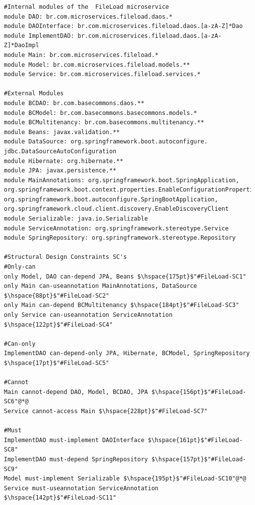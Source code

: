 \documentclass[12pt]{article}
\begin{document}
\begin{lstlisting}[style=colorido, caption={\textcolor{blue}{FileLoad microservice's architectural design specification.}},label={list:especArquiteturalFileLoad}
]
#Internal modules of the  FileLoad microservice
module DAO: br.com.microservices.fileload.daos.*
module DAOInterface: br.com.microservices.fileload.daos.[a-zA-Z]*Dao
module ImplementDAO: br.com.microservices.fileload.daos.[a-zA-Z]*DaoImpl
module Main: br.com.microservices.fileload.*
module Model: br.com.microservices.fileload.models.**
module Service: br.com.microservices.fileload.services.*

#External Modules
module BCDAO: br.com.basecommons.daos.**
module BCModel: br.com.basecommons.basecommons.models.*
module BCMultitenancy: br.com.basecommons.multitenancy.**
module Beans: javax.validation.**
module DataSource: org.springframework.boot.autoconfigure.
jdbc.DataSourceAutoConfiguration
module Hibernate: org.hibernate.**
module JPA: javax.persistence.**
module MainAnnotations: org.springframework.boot.SpringApplication, 
org.springframework.boot.context.properties.EnableConfigurationProperties, org.springframework.boot.autoconfigure.SpringBootApplication, org.springframework.cloud.client.discovery.EnableDiscoveryClient
module Serializable: java.io.Serializable
module ServiceAnnotation: org.springframework.stereotype.Service
module SpringRepository: org.springframework.stereotype.Repository

#Structural Design Constraints SC's
#Only-can 
only Model, DAO can-depend JPA, Beans $\hspace{175pt}$"#FileLoad-SC1"
only Main can-useannotation MainAnnotations, DataSource $\hspace{88pt}$"#FileLoad-SC2"
only Main can-depend BCMultitenancy	$\hspace{184pt}$"#FileLoad-SC3"
only Service can-useannotation ServiceAnnotation $\hspace{122pt}$"#FileLoad-SC4"

#Can-only
ImplementDAO can-depend-only JPA, Hibernate, BCModel, SpringRepository $\hspace{17pt}$"#FileLoad-SC5"
	
#Cannot
Main cannot-depend DAO, Model, BCDAO, JPA $\hspace{156pt}$"#FileLoad-SC6"@*@
Service cannot-access Main $\hspace{228pt}$"#FileLoad-SC7"

#Must
ImplementDAO must-implement DAOInterface $\hspace{161pt}$"#FileLoad-SC8"
ImplementDAO must-depend SpringRepository $\hspace{157pt}$"#FileLoad-SC9"
Model must-implement Serializable $\hspace{195pt}$"#FileLoad-SC10"@*@
Service must-useannotation ServiceAnnotation $\hspace{142pt}$"#FileLoad-SC11"
\end{lstlisting}
\end{document}
